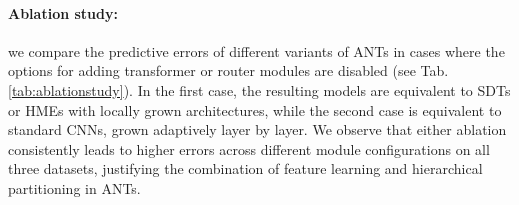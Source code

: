 

\paragraph{Ablation study:} we compare the predictive errors of different variants of ANTs in cases where the options for adding transformer or router modules are disabled (see Tab. \ref{tab:ablationstudy}). In the first case, the resulting models are equivalent to SDTs \cite{suarez1999globally} or HMEs \cite{jordan1994hierarchical} with locally grown architectures, while the second case is equivalent to standard CNNs, grown adaptively layer by layer. We observe that either ablation consistently leads to higher errors across different module configurations on all three datasets, justifying the combination of feature learning and hierarchical partitioning in ANTs.


